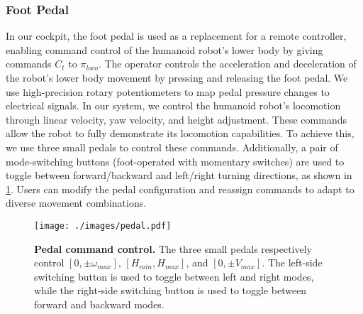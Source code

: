 \subsubsection{\textbf{Foot Pedal}}
In our cockpit, the foot pedal is used as a replacement for a remote controller, enabling command control of the humanoid robot's lower body by giving commands $C_t$ to $\pi_{loco}$. The operator controls the acceleration and deceleration of the robot's lower body movement by pressing and releasing the foot pedal.
We use high-precision rotary potentiometers to map pedal pressure changes to electrical signals. In our system, we control the humanoid robot's locomotion through linear velocity, yaw velocity, and height adjustment. These commands allow  the robot to fully demonstrate its locomotion capabilities. To achieve this, we use three small pedals to control these commands. Additionally, a pair of mode-switching buttons (foot-operated with momentary switches) are used to toggle between forward/backward and left/right turning directions, as shown in \cref{fig:pedal}. Users can modify the pedal configuration and reassign commands to adapt to diverse movement combinations.
\begin{figure}[!ht]
  \centering
  \texttt{[image: ./images/pedal.pdf]}
  \caption{\textbf{Pedal command control.} The three small pedals respectively control $ [0, \pm{\omega_{max}}] $, $ [{H_{min}}, {H_{max}}] $, and $ [0, \pm{V_{max}}] $. The left-side switching button is used to toggle between left and right modes, while the right-side switching button is used to toggle between forward and backward modes.}
  \vspace{-5pt}
  \label{fig:pedal}
\end{figure}


 